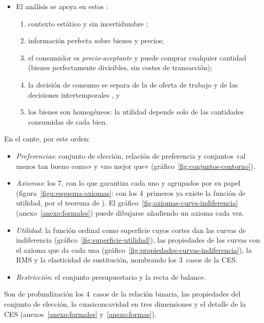 \documentclass[11pt]{article}
\begin{document}
\begin{infografia}[H]
\centering
\caption{De las preferencias a la demanda de mercado}\label{figu:esquema-ingredientes}
\end{infografia}

\begin{itemize}
\item El análisis se apoya en estos :
  \begin{enumerate}
  \item contexto estático y sin incertidumbre ;
  \item información perfecta sobre bienes y precios;
  \item el consumidor es \emph{precio-aceptante} y puede comprar cualquier cantidad (bienes perfectamente divisibles, sin costes de transacción);
  \item la decisión de consumo se separa de la de oferta de trabajo  y de las decisiones intertemporales , y
  \item los bienes son homogéneos: la utilidad depende solo de las cantidades consumidas de cada bien.
  \end{enumerate}
\end{itemize}

\begin{notaopositor}
En el cante, por este orden:
\begin{itemize}
\item \emph{Preferencias}: conjunto de elección, relación de preferencia y conjuntos «al menos tan bueno como» y «no mejor que» (gráfico~\ref{fig:conjuntos-contorno}).
\item \emph{Axiomas}: los 7, con lo que garantiza cada uno y agrupados por su papel (figura~\ref{figu:esquema-axiomas}: con los 4~primeros ya existe la función de utilidad, por el teorema de ). El gráfico~\ref{fig:axiomas-curva-indiferencia} (anexo~\ref{anexo:formales}) puede dibujarse añadiendo un axioma cada vez.
\item \emph{Utilidad}: la función ordinal como superficie cuyos cortes dan las curvas de indiferencia (gráfico~\ref{fig:superficie-utilidad}), las propiedades de las curvas con el axioma que da cada una (gráfico~\ref{fig:propiedades-curvas-indiferencia}), la RMS y la elasticidad de sustitución, nombrando los 3~casos de la CES.
\item \emph{Restricción}: el conjunto presupuestario y la recta de balance.
\end{itemize}
Son de profundización los 4~casos de la relación binaria, las propiedades del conjunto de elección, la cuasiconcavidad en tres dimensiones y el detalle de la CES (anexos~\ref{anexo:formales} y~\ref{anexo:formas}).
\end{notaopositor}
\end{document}
